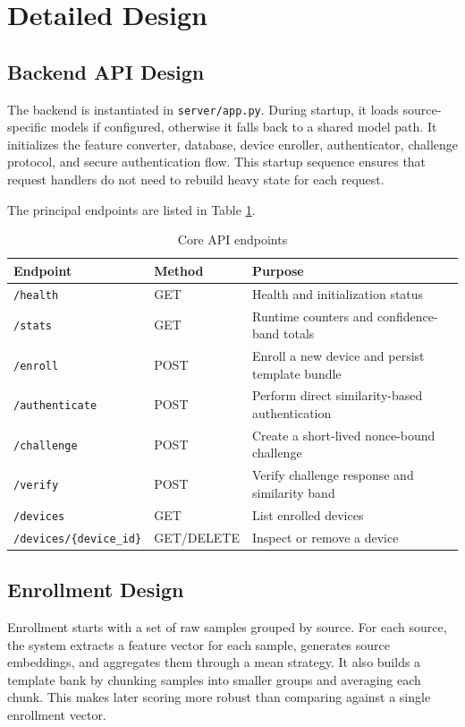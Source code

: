 \documentclass[12pt]{report}
\begin{document}
\section{Detailed Design}
\subsection{Backend API Design}
The backend is instantiated in \texttt{server/app.py}. During startup, it loads source-specific models if configured, otherwise it falls back to a shared model path. It initializes the feature converter, database, device enroller, authenticator, challenge protocol, and secure authentication flow. This startup sequence ensures that request handlers do not need to rebuild heavy state for each request.

The principal endpoints are listed in Table \ref{tab:endpoints}.

\begin{table}[H]
\centering
\caption{Core API endpoints}
\label{tab:endpoints}
\renewcommand{\arraystretch}{1.3}
\begin{tabular}{p{}p{}p{}}
\toprule
\textbf{Endpoint} & \textbf{Method} & \textbf{Purpose} \\
\midrule
\texttt{/health} & GET & Health and initialization status \\
\texttt{/stats} & GET & Runtime counters and confidence-band totals \\
\texttt{/enroll} & POST & Enroll a new device and persist template bundle \\
\texttt{/authenticate} & POST & Perform direct similarity-based authentication \\
\texttt{/challenge} & POST & Create a short-lived nonce-bound challenge \\
\texttt{/verify} & POST & Verify challenge response and similarity band \\
\texttt{/devices} & GET & List enrolled devices \\
\texttt{/devices/\{device\_id\}} & GET/DELETE & Inspect or remove a device \\
\bottomrule
\end{tabular}
\end{table}

\subsection{Enrollment Design}
Enrollment starts with a set of raw samples grouped by source. For each source, the system extracts a feature vector for each sample, generates source embeddings, and aggregates them through a mean strategy. It also builds a template bank by chunking samples into smaller groups and averaging each chunk. This makes later scoring more robust than comparing against a single enrollment vector.
\end{document}
